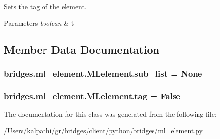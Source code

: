Sets the tag of the element. 


\begin{DoxyParams}{Parameters}
{\em boolean} & t \\
\hline
\end{DoxyParams}


\subsection{Member Data Documentation}
\hypertarget{classbridges_1_1ml__element_1_1_m_lelement_ad8c56ba876dc2331e63bb1cff279375a}{}
\subsubsection[{sub\+\_\+list}]{\setlength{\rightskip}{0pt plus 5cm}bridges.\+ml\+\_\+element.\+M\+Lelement.\+sub\+\_\+list = None\hspace{0.3cm}{\ttfamily [static]}}\label{classbridges_1_1ml__element_1_1_m_lelement_ad8c56ba876dc2331e63bb1cff279375a}
\hypertarget{classbridges_1_1ml__element_1_1_m_lelement_aebde8498e7a70f6d94bb639cfac1f9c6}{}
\subsubsection[{tag}]{\setlength{\rightskip}{0pt plus 5cm}bridges.\+ml\+\_\+element.\+M\+Lelement.\+tag = False\hspace{0.3cm}{\ttfamily [static]}}\label{classbridges_1_1ml__element_1_1_m_lelement_aebde8498e7a70f6d94bb639cfac1f9c6}


The documentation for this class was generated from the following file\+:\begin{DoxyCompactItemize}
\item 
/\+Users/kalpathi/gr/bridges/client/python/bridges/\hyperlink{ml__element_8py}{ml\+\_\+element.\+py}\end{DoxyCompactItemize}
